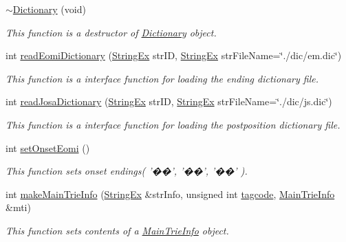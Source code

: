 \begin{CompactItemize}
\hyperlink{classkmaOrange_1_1Dictionary_11930f473ace7cb8a0f38997a2b09dcb}{$\sim$Dictionary} (void)
\begin{CompactList}\small\item\em This function is a destructor of \hyperlink{classkmaOrange_1_1Dictionary}{Dictionary} object. \item\end{CompactList}\item 
int \hyperlink{classkmaOrange_1_1Dictionary_1a8b6abce191eca63d1d9bfeaf0ee792}{readEomiDictionary} (\hyperlink{classStringEx}{StringEx} strID, \hyperlink{classStringEx}{StringEx} strFileName=\char`\"{}./dic/em.dic\char`\"{})
\begin{CompactList}\small\item\em This function is a interface function for loading the ending dictionary file. \item\end{CompactList}\item 
int \hyperlink{classkmaOrange_1_1Dictionary_8caa9366495de16bce7c7d9923a3a0ff}{readJosaDictionary} (\hyperlink{classStringEx}{StringEx} strID, \hyperlink{classStringEx}{StringEx} strFileName=\char`\"{}./dic/js.dic\char`\"{})
\begin{CompactList}\small\item\em This function is a interface function for loading the postposition dictionary file. \item\end{CompactList}\item 
int \hyperlink{classkmaOrange_1_1Dictionary_899b2e257d771091749463afe6dbeab5}{setOnsetEomi} ()
\begin{CompactList}\small\item\em This function sets onset endings( '��', '��', '��' ). \item\end{CompactList}\item 
int \hyperlink{classkmaOrange_1_1Dictionary_49b4c3ca79471264e213d12e12d8333c}{makeMainTrieInfo} (\hyperlink{classStringEx}{StringEx} \&strInfo, unsigned int \hyperlink{structkmaOrange_1_1tagcode}{tagcode}, \hyperlink{classMainTrieInfo}{MainTrieInfo} \&mti)
\begin{CompactList}\small\item\em This function sets contents of a \hyperlink{classMainTrieInfo}{MainTrieInfo} object. \item\end{CompactList}\item 

\end{CompactItemize}
